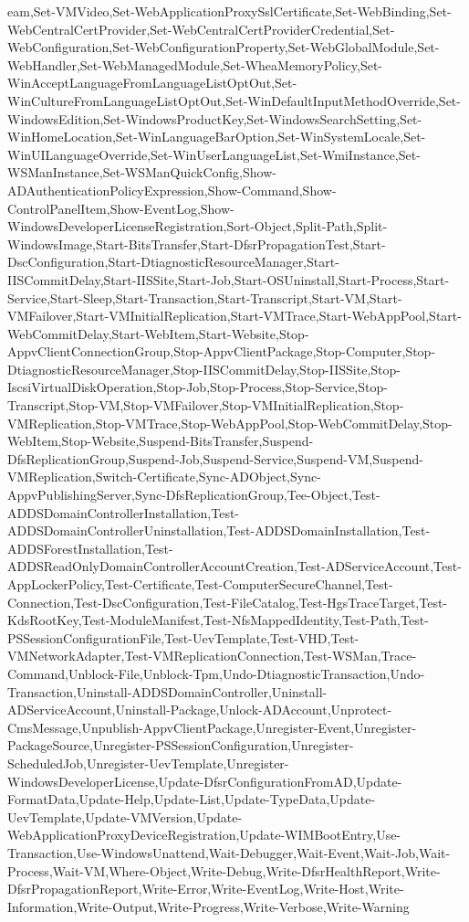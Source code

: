 {{eam,Set-VMVideo,Set-WebApplicationProxySslCertificate,Set-WebBinding,Set-WebCentralCertProvider,Set-WebCentralCertProviderCredential,Set-WebConfiguration,Set-WebConfigurationProperty,Set-WebGlobalModule,Set-WebHandler,Set-WebManagedModule,Set-WheaMemoryPolicy,Set-WinAcceptLanguageFromLanguageListOptOut,Set-WinCultureFromLanguageListOptOut,Set-WinDefaultInputMethodOverride,Set-WindowsEdition,Set-WindowsProductKey,Set-WindowsSearchSetting,Set-WinHomeLocation,Set-WinLanguageBarOption,Set-WinSystemLocale,Set-WinUILanguageOverride,Set-WinUserLanguageList,Set-WmiInstance,Set-WSManInstance,Set-WSManQuickConfig,Show-ADAuthenticationPolicyExpression,Show-Command,Show-ControlPanelItem,Show-EventLog,Show-WindowsDeveloperLicenseRegistration,Sort-Object,Split-Path,Split-WindowsImage,Start-BitsTransfer,Start-DfsrPropagationTest,Start-DscConfiguration,Start-DtiagnosticResourceManager,Start-IISCommitDelay,Start-IISSite,Start-Job,Start-OSUninstall,Start-Process,Start-Service,Start-Sleep,Start-Transaction,Start-Transcript,Start-VM,Start-VMFailover,Start-VMInitialReplication,Start-VMTrace,Start-WebAppPool,Start-WebCommitDelay,Start-WebItem,Start-Website,Stop-AppvClientConnectionGroup,Stop-AppvClientPackage,Stop-Computer,Stop-DtiagnosticResourceManager,Stop-IISCommitDelay,Stop-IISSite,Stop-IscsiVirtualDiskOperation,Stop-Job,Stop-Process,Stop-Service,Stop-Transcript,Stop-VM,Stop-VMFailover,Stop-VMInitialReplication,Stop-VMReplication,Stop-VMTrace,Stop-WebAppPool,Stop-WebCommitDelay,Stop-WebItem,Stop-Website,Suspend-BitsTransfer,Suspend-DfsReplicationGroup,Suspend-Job,Suspend-Service,Suspend-VM,Suspend-VMReplication,Switch-Certificate,Sync-ADObject,Sync-AppvPublishingServer,Sync-DfsReplicationGroup,Tee-Object,Test-ADDSDomainControllerInstallation,Test-ADDSDomainControllerUninstallation,Test-ADDSDomainInstallation,Test-ADDSForestInstallation,Test-ADDSReadOnlyDomainControllerAccountCreation,Test-ADServiceAccount,Test-AppLockerPolicy,Test-Certificate,Test-ComputerSecureChannel,Test-Connection,Test-DscConfiguration,Test-FileCatalog,Test-HgsTraceTarget,Test-KdsRootKey,Test-ModuleManifest,Test-NfsMappedIdentity,Test-Path,Test-PSSessionConfigurationFile,Test-UevTemplate,Test-VHD,Test-VMNetworkAdapter,Test-VMReplicationConnection,Test-WSMan,Trace-Command,Unblock-File,Unblock-Tpm,Undo-DtiagnosticTransaction,Undo-Transaction,Uninstall-ADDSDomainController,Uninstall-ADServiceAccount,Uninstall-Package,Unlock-ADAccount,Unprotect-CmsMessage,Unpublish-AppvClientPackage,Unregister-Event,Unregister-PackageSource,Unregister-PSSessionConfiguration,Unregister-ScheduledJob,Unregister-UevTemplate,Unregister-WindowsDeveloperLicense,Update-DfsrConfigurationFromAD,Update-FormatData,Update-Help,Update-List,Update-TypeData,Update-UevTemplate,Update-VMVersion,Update-WebApplicationProxyDeviceRegistration,Update-WIMBootEntry,Use-Transaction,Use-WindowsUnattend,Wait-Debugger,Wait-Event,Wait-Job,Wait-Process,Wait-VM,Where-Object,Write-Debug,Write-DfsrHealthReport,Write-DfsrPropagationReport,Write-Error,Write-EventLog,Write-Host,Write-Information,Write-Output,Write-Progress,Write-Verbose,Write-Warning
}}
